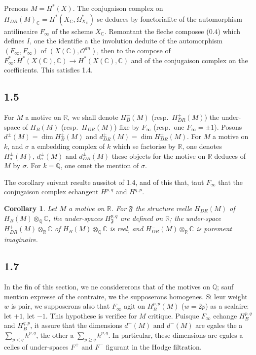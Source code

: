 \documentclass[12pt,a4paper]{article}
\theoremstyle{plain}
\newtheorem{corollary}[theorem]{Corollary}
\theoremstyle{definition}
\theoremstyle{remark}
\newcommand{\Q}{\mathbb{Q}}
\newcommand{\R}{\mathbb{R}}
\newcommand{\C}{\mathbb{C}}
\begin{document}
Prenons $M = H^*(X)$. The conjugaison complex on $H_{DR}(M)_\C = H^*(X_\C, \Omega^*_{X_\C})$
se deduces by fonctorialite of the automorphism antilineaire $F_\infty$ of the scheme $X_\C$.
Remontant the fleche composee (0.4) which defines $I$, one the identifie a the involution deduite
of the automorphism $(F_\infty, F_\infty)$ of $(X(\C), \mathcal{O}^{an})$, then to the compose of
$F_\infty^*: H^*(X(\C), \C) \to H^*(X(\C), \C)$ and of the conjugaison complex on the coefficients.
This satisfies 1.4.

\subsection*{1.5}

For $M$ a motive on $\R$, we shall denote $H^\pm_B(M)$ (resp.~$H^\pm_{DR}(M)$) the under-space
of $H_B(M)$ (resp.~$H_{DR}(M)$) fixe by $F_\infty$ (resp.~one $F_\infty = \pm 1$). Posons
$d^\pm(M) = \dim H^\pm_B(M)$ and $d^\pm_{DR}(M) = \dim H^\pm_{DR}(M)$. For $M$ a motive on $k$,
and $\sigma$ a embedding complex of $k$ which se factorise by $\R$, one denotes $H^\pm_\sigma(M)$,
$d^\pm_\sigma(M)$ and $d^\pm_{DR}(M)$ these objects for the motive on $\R$ deduces of $M$ by $\sigma$.
For $k = \Q$, one omet the mention of $\sigma$.

The corollary suivant resulte aussitot of 1.4, and of this that, taut $F_\infty$ that the conjugaison
complex echangent $H^{p,q}$ and $H^{q,p}$.

\begin{corollary}\label{cor:1.6}
Let $M$ a motive on $\R$. For $\mathfrak{F}$ the structure reelle $H_{DR}(M)$ of
$H_B(M) \otimes_\Q \C$, the under-spaces $H^{p,q}_\mathfrak{F}$ are defined on $\R$; the under-space
$H^+_{DR}(M) \otimes_\R \C$ of $H_B(M) \otimes_\Q \C$ is reel, and $H^-_{DR}(M) \otimes_\R \C$ is
purement imaginaire.
\end{corollary}

\subsection*{1.7}

In the fin of this section, we ne considererons that of the motives on $\Q$;
sauf mention expresse of the contraire, we the supposerons homogenes. Si leur weight
$w$ is pair, we supposerons also that $F_\infty$ agit on $H^{p,p}_B(M)$ ($w = 2p$) as a
scalaire: let $+1$, let $-1$. This hypothese is verifiee for $M$ critique. Puisque
$F_\infty$ echange $H^{p,q}_B$ and $H^{q,p}_B$, it assure that the dimensions $d^+(M)$ and $d^-(M)$
are egales the a $\sum_{p < q} h^{p,q}$, the other a $\sum_{p \geq q} h^{p,q}$. In particular, these dimensions
are egales a celles of under-spaces $F^+$ and $F^-$ figurant in the Hodge filtration.
\end{document}
